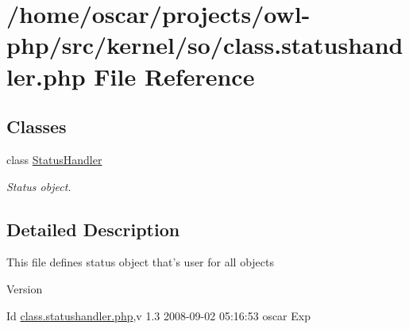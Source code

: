 \section{/home/oscar/projects/owl-\/php/src/kernel/so/class.statushandler.php File Reference}
\label{class_8statushandler_8php}
\subsection*{Classes}
\begin{DoxyCompactItemize}
\item 
class \hyperlink{classStatusHandler}{StatusHandler}
\begin{DoxyCompactList}\small\item\em Status object. \item\end{DoxyCompactList}\end{DoxyCompactItemize}


\subsection{Detailed Description}
This file defines status object that's user for all objects \begin{DoxyVersion}{Version}

\end{DoxyVersion}
\begin{DoxyParagraph}{Id}
\hyperlink{class_8statushandler_8php}{class.statushandler.php},v 1.3 2008-\/09-\/02 05:16:53 oscar Exp 
\end{DoxyParagraph}
